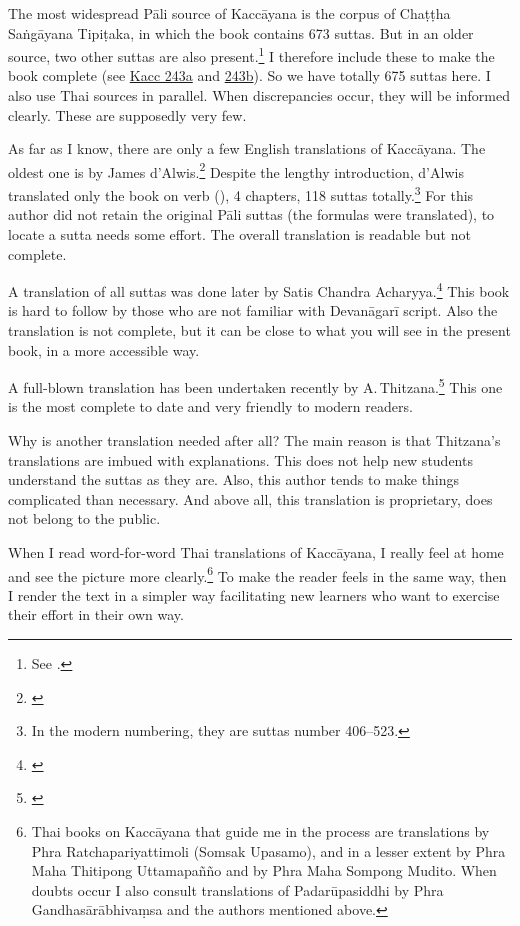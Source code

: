 The most widespread Pāli source of Kaccāyana is the corpus of Chaṭṭha Saṅgāyana Tipiṭaka, in which the book contains 673 suttas. But in an older source, two other suttas are also present.\footnote{See \citealp[p.~221]{thitzana:kacc1}.} I therefore include these to make the book complete (see \hyperref[sut:243a]{Kacc 243a} and \hyperref[sut:243b]{243b}). So we have totally 675 suttas here. I also use Thai sources in parallel. When discrepancies occur, they will be informed clearly. These are supposedly very few.

As far as I know, there are only a few English translations of Kaccāyana. The oldest one is by James d'Alwis.\footnote{\citealp{dalwis:kach}} Despite the lengthy introduction, d'Alwis translated only the book on verb (), 4 chapters, 118 suttas totally.\footnote{In the modern numbering, they are suttas number 406--523.} For this author did not retain the original Pāli suttas (the formulas were translated), to locate a sutta needs some effort. The overall translation is readable but not complete.

A translation of all suttas was done later by Satis Chandra Acharyya.\footnote{\citealp{satis:kacc}} This book is hard to follow by those who are not familiar with Devanāgarī script. Also the translation is not complete, but it can be close to what you will see in the present book, in a more accessible way.

A full-blown translation has been undertaken recently by A.\,Thitzana.\footnote{\citealp{thitzana:kacc2}} This one is the most complete to date and very friendly to modern readers.

Why is another translation needed after all? The main reason is that Thitzana's translations are imbued with explanations. This does not help new students understand the suttas as they are. Also, this author tends to make things complicated than necessary. And above all, this translation is proprietary, does not belong to the public.

When I read word-for-word Thai translations of Kaccāyana, I really feel at home and see the picture more clearly.\footnote{Thai books on Kaccāyana that guide me in the process are translations by Phra Ratchapariyattimoli (Somsak Upasamo), and in a lesser extent by Phra Maha Thitipong Uttamapañño and by Phra Maha Sompong Mudito. When doubts occur I also consult translations of Padarūpasiddhi by Phra Gan\-dhasārābhivaṃsa and the authors mentioned above.} To make the reader feels in the same way, then I render the text in a simpler way facilitating new learners who want to exercise their effort in their own way.

